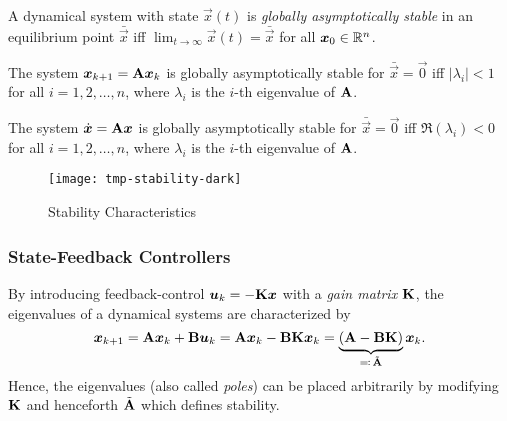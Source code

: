 			\begin{definition}
				A dynamical system with state \( \vec{x}(t) \) is \emph{globally asymptotically stable} in an equilibrium point \( \bar{\vec{x}} \) iff \( \lim_{t \to \infty} \vec{x}(t) = \bar{\vec{x}} \) for all \( \bm{x}_0 \in \mathbb{R}^n \).
			\end{definition}

			\begin{theorem}
				The system \( \bm{x}_{k + 1} = \bm{\mathrm{A}} \bm{x}_k \) is globally asymptotically stable for \( \bar{\vec{x}} = \vec{0} \) iff \( \lvert \lambda_i \rvert < 1 \) for all \( i = 1, 2, \dots, n \), where \( \lambda_i \) is the \(i\)-th eigenvalue of \(\bm{\mathrm{A}}\).
			\end{theorem}
			\begin{theorem}
				The system \( \dot{\bm{x}} = \bm{\mathrm{A}} \bm{x} \) is globally asymptotically stable for \( \bar{\vec{x}} = \vec{0} \) iff \( \Re(\lambda_i) < 0 \) for all \( i = 1, 2, \dots, n \), where \( \lambda_i \) is the \(i\)-th eigenvalue of \(\bm{\mathrm{A}}\).
			\end{theorem}

			\begin{figure}
				\centering
				\texttt{[image: tmp-stability-dark]}
				\caption{Stability Characteristics}
				\label{fig:stability}
			\end{figure}

			\subsubsection{State-Feedback Controllers}
				By introducing feedback-control \( \bm{u}_k = -\bm{\mathrm{K}} \bm{x} \) with a \emph{gain matrix} \(\bm{\mathrm{K}}\), the eigenvalues of a dynamical systems are characterized by
				\begin{equation}
					\bm{x}_{k + 1}
						= \bm{\mathrm{A}} \bm{x}_k + \bm{\mathrm{B}} \bm{u}_k
						= \bm{\mathrm{A}} \bm{x}_k - \bm{\mathrm{B}} \bm{\mathrm{K}} \bm{x}_k
						= \underbrace{(\bm{\mathrm{A}} - \bm{\mathrm{B}} \bm{\mathrm{K}})}_{\eqqcolon\, \tilde{\bm{\mathrm{A}}}} \bm{x}_k.
				\end{equation}
				Hence, the eigenvalues (also called \emph{poles}) can be placed arbitrarily by modifying \(\bm{\mathrm{K}}\) and henceforth \(\tilde{\bm{\mathrm{A}}}\) which defines stability.

